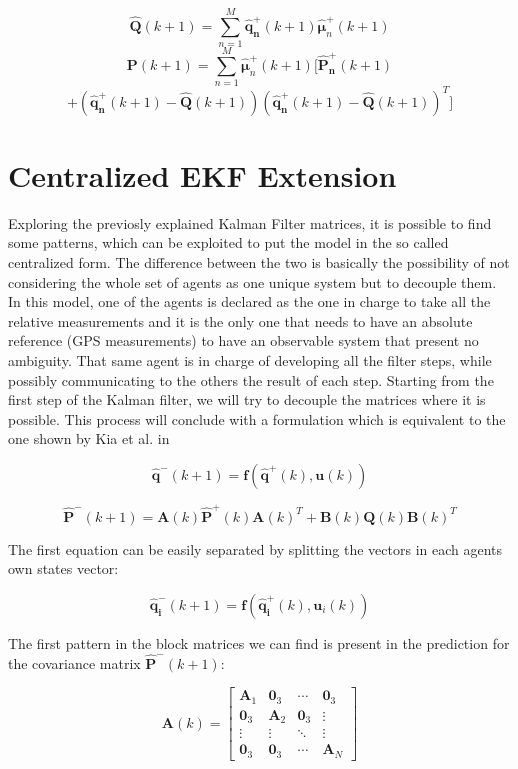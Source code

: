 \documentclass[conference]{IEEEtran}
\begin{document}
 
$$ \mathbf{\hat{Q}}(k+1) = \sum_{n = 1}^{M} \mathbf{\hat{q}_{n}^{+}}(k+1)\mathbf{\hat{\mu}}_{n}^{+}(k+1) $$
$$ \mathbf{P}(k+1) = \sum_{n = 1}^{M} \mathbf{\hat{\mu}}_{n}^{+}(k+1)[\mathbf{\hat{ P}_{n}^{+}}(k+1)$$
$$+( \mathbf{\hat{q}_{n}^{+}}(k+1) -  \mathbf{\hat{Q}}(k+1))( \mathbf{\hat{q}_{n}^{+}}(k+1) -  \mathbf{\hat{Q}}(k+1))^{T} ] $$


\section{Centralized EKF Extension}

Exploring the previosly explained Kalman Filter matrices, it is possible to find some patterns, which can be exploited to put the model in the so called centralized form. The difference between the two is basically the possibility of not considering the whole set of agents as one unique system but to decouple them. In this model, one of the agents is declared as the one in charge to take all the relative measurements and it is the only one that needs to have an absolute reference (GPS measurements) to have an observable system that present no ambiguity. That same agent is in charge of developing all the filter steps, while possibly communicating to the others the result of each step.
Starting from the first step of the Kalman filter, we will try to decouple the matrices where it is possible. This process will conclude with a formulation which is equivalent to the one shown by Kia et al. in \cite{Kia-Martinez}

$$  \mathbf{\hat{q}^{-}}(k+1) =  \mathbf{f}(\mathbf{\hat{q}^{+}}(k), \mathbf{u}(k)) $$

$$  \mathbf{\hat{P}^{-}}(k+1) =  \mathbf{A}(k)\mathbf{\hat{P}^{+}}(k)\mathbf{A}(k)^{T} + \mathbf{B}(k)\mathbf{{Q}}(k) \mathbf{B}(k)^{T} $$

The first equation can be easily separated by splitting the vectors in each agents own states vector:

$$  \mathbf{\hat{q}_{i}^{-}}(k+1) =  \mathbf{f}(\mathbf{\hat{q}_{i}^{+}}(k), \mathbf{u}_{i}(k)) $$

The first pattern in the block matrices we can find is present in the prediction for the covariance matrix $\mathbf{\hat{P}}^{-}(k+1)$:

 $$ \mathbf{A}(k) =  \begin{bmatrix} \mathbf{A}_{1} &  \mathbf{0}_{3} &\cdots & \mathbf{0}_{3} \\  \mathbf{0}_{3} & \mathbf{A}_{2} &  \mathbf{0}_{3} & \vdots \\ \vdots & \vdots & \ddots & \vdots \\ \mathbf{0}_{3} &  \mathbf{0}_{3} &\cdots& \mathbf{A}_{N} \end{bmatrix}$$
\end{document}
